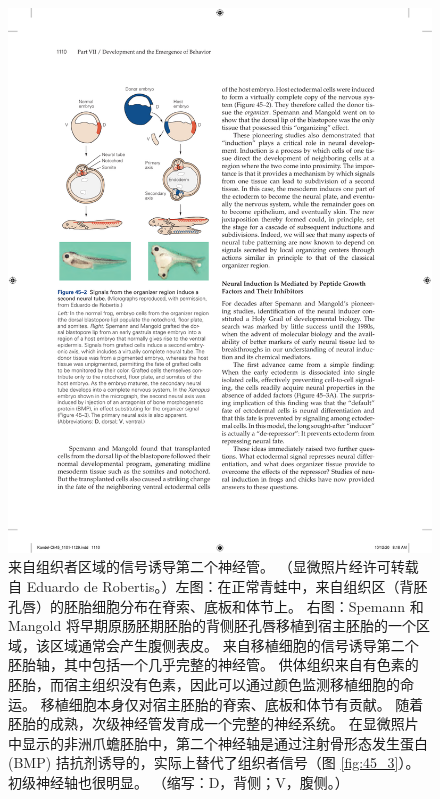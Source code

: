 \begin{figure}[htbp]
	\centering
	\includegraphics[width=0.5\linewidth]{chap45/fig_45_2}
	\caption{来自组织者区域的信号诱导第二个神经管。 （显微照片经许可转载自 Eduardo de Robertis。）左图：在正常青蛙中，来自组织区（背胚孔唇）的胚胎细胞分布在脊索、底板和体节上。 右图：Spemann 和 Mangold 将早期原肠胚期胚胎的背侧胚孔唇移植到宿主胚胎的一个区域，该区域通常会产生腹侧表皮。 来自移植细胞的信号诱导第二个胚胎轴，其中包括一个几乎完整的神经管。 供体组织来自有色素的胚胎，而宿主组织没有色素，因此可以通过颜色监测移植细胞的命运。 移植细胞本身仅对宿主胚胎的脊索、底板和体节有贡献。 随着胚胎的成熟，次级神经管发育成一个完整的神经系统。 在显微照片中显示的非洲爪蟾胚胎中，第二个神经轴是通过注射骨形态发生蛋白 (BMP) 拮抗剂诱导的，实际上替代了组织者信号（图 \ref{fig:45_3}）。 初级神经轴也很明显。 （缩写：D，背侧；V，腹侧。）}
	\label{fig:45_2}
\end{figure}

